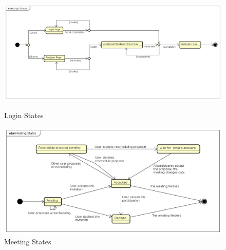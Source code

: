 \begin{figure}[h]
	\vspace*{-10cm}
	\includegraphics[width=\textwidth]{Images/StateCharts/LoginStates.png}
	\caption{Login States}
	\vspace{2cm}
	\includegraphics[width=\textwidth]{Images/StateCharts/MeetingStates.png}
	\caption{Meeting States}
\end{figure}